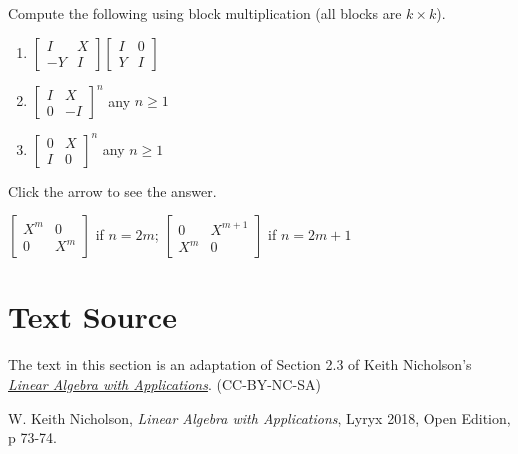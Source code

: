 \documentclass{ximera}
\begin{document}
\begin{problem}\label{prob:blockmatmult_vars}
Compute the following using block multiplication (all blocks are $k \times k$).

\begin{enumerate}
\item
$\left[ \begin{array}{rr}
I & X \\
-Y & I
\end{array} \right] \left[ \begin{array}{rr}
I & 0 \\
Y & I
\end{array} \right]
$

\item %
$\left[ \begin{array}{cc}
I & X \\
0 & -I
\end{array} \right]^{n}
$ any $n \geq 1$

\item %
$\left[ \begin{array}{cc}
0 & X \\
I & 0
\end{array} \right]^{n}
$ any $n \geq 1$
\end{enumerate}

Click the arrow to see the answer.
\begin{expandable}
$\left[ \begin{array}{cc}
X^{m} & 0 \\
0 & X^{m}
\end{array} \right]$ if $n = 2m$;
$\left[ \begin{array}{cc}
0 & X^{m + 1} \\
X^{m} & 0
\end{array} \right]$ if $n = 2m + 1$
\end{expandable}


\end{problem}

\section*{Text Source}
The text in this section is an adaptation of Section 2.3 of Keith Nicholson's \href{https://open.umn.edu/opentextbooks/textbooks/linear-algebra-with-applications}{\it Linear Algebra with Applications}. (CC-BY-NC-SA)

W. Keith Nicholson, {\it Linear Algebra with Applications}, Lyryx 2018, Open Edition, p 73-74.
\end{document}
